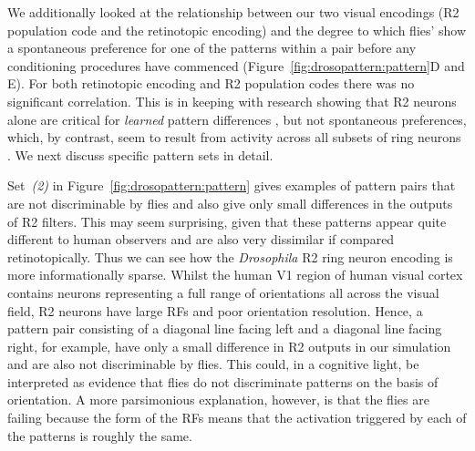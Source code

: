 We additionally looked at the relationship between our two visual encodings (R2 population code and the retinotopic encoding) and the degree to which flies' show a spontaneous preference for one of the patterns within a pair before any conditioning procedures have commenced (Figure~\ref{fig:drosopattern:pattern}D and E). For both retinotopic encoding and R2 population codes there was no significant correlation. This is in keeping with research showing that R2 neurons alone are critical for \emph{learned} pattern differences \cite{Ernst1999}, but not spontaneous preferences, which, by contrast, seem to result from activity across all subsets of ring neurons \cite{Solanki2015}.
We next discuss specific pattern sets in detail.

Set~\emph{(2)} in Figure~\ref{fig:drosopattern:pattern} gives examples of pattern pairs that are not discriminable by flies and also give only small differences in the outputs of R2 filters. This may seem surprising, given that these patterns appear quite different to human observers and are also very dissimilar if compared retinotopically. Thus we can see how the \emph{Drosophila} R2 ring neuron encoding is more informationally sparse. Whilst the human V1 region of human visual cortex contains neurons representing a full range of orientations all across the visual field, R2 neurons have large RFs and poor orientation resolution. Hence, a pattern pair consisting of a diagonal line facing left and a diagonal line facing right, for example, have only a small difference in R2 outputs in our simulation and are also not discriminable by flies.
This could, in a cognitive light, be interpreted as evidence that flies do not discriminate patterns on the basis of orientation.
A more parsimonious explanation, however, is that the flies are failing because the form of the \acp{RF} means that the activation triggered by each of the patterns is roughly the same.

